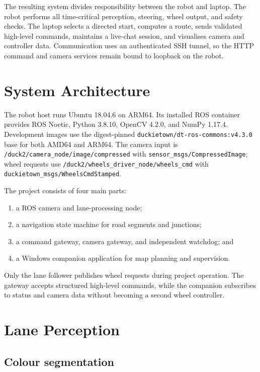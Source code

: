 \documentclass[10pt,a4paper,twocolumn]{article}
\newcommand{\code}[1]{\texttt{#1}}
\begin{document}
The resulting system divides responsibility between the robot and laptop. The
robot performs all time-critical perception, steering, wheel output, and safety
checks. The laptop selects a directed start, computes a route, sends validated
high-level commands, maintains a live-chat session, and visualises camera and controller data. Communication
uses an authenticated SSH tunnel, so the HTTP command and camera services remain
bound to loopback on the robot.

\section{System Architecture}

The robot host runs Ubuntu 18.04.6 on ARM64. Its installed ROS container
provides ROS Noetic, Python 3.8.10, OpenCV 4.2.0, and NumPy 1.17.4. Development images use the digest-pinned
\code{duckietown/dt-ros-commons:v4.3.0} base for both AMD64 and ARM64. The
camera input is \code{/duck2/camera\_node/image/compressed} with
\code{sensor\_msgs/CompressedImage}; wheel requests use
\code{/duck2/wheels\_driver\_node/wheels\_cmd} with
\code{duckietown\_msgs/WheelsCmdStamped}.

The project consists of four main parts:

\begin{enumerate}
    \item a ROS camera and lane-processing node;
    \item a navigation state machine for road segments and junctions;
    \item a command gateway, camera gateway, and independent watchdog; and
    \item a Windows companion application for map planning and supervision.
\end{enumerate}

Only the lane follower publishes wheel requests during project operation. The
gateway accepts structured high-level commands, while the companion subscribes
to status and camera data without becoming a second wheel controller.

\section{Lane Perception}

\subsection{Colour segmentation}
\end{document}
